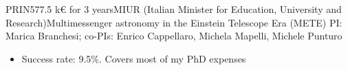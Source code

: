%
%
%


\begin{experiences}
     {PRIN}{577.5 k€ for 3 years}{MIUR (Italian Minister for Education, University and Research)}{Multimessenger astronomy in the Einstein Telescope Era (METE)}{} {PI: Marica Branchesi; co-PIs: Enrico Cappellaro, Michela Mapelli, Michele Punturo}{ 
    \begin{itemize}
        \item Success rate: 9.5\%. Covers most of my PhD expenses
    \end{itemize}
    }
\end{experiences}